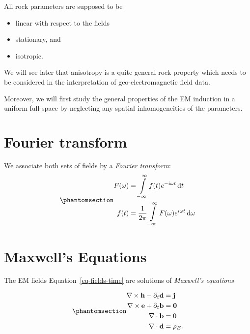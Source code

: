 \documentclass[
  a4paper,
  DIV=11,
  numbers=noendperiod]{scrreprt}
\providecommand{\tightlist}{%
  \setlength{\itemsep}{0pt}\setlength{\parskip}{0pt}}\usepackage{longtable,booktabs,array}
\begin{document}
All rock parameters are supposed to be

\begin{itemize}
\tightlist
\item
  linear with respect to the fields
\item
  stationary, and
\item
  isotropic.
\end{itemize}

We will see later that anisotropy is a quite general rock property which
needs to be considered in the interpretation of geo-electromagnetic
field data.

Moreover, we will first study the general properties of the EM induction
in a uniform full-space by neglecting any spatial inhomogeneities of the
parameters.

\chapter{Fourier transform}\label{fourier-transform}

We associate both sets of fields by a \emph{Fourier transform}:
\begin{equation}\phantomsection\label{eq-fourier}{
\begin{align}
F(\omega) & = \int\limits_{-\infty}^\infty f(t) e^{-i\omega t}\,\mathrm d t \\
f(t) & = \frac{1}{2\pi} \int\limits_{-\infty}^\infty F(\omega) e^{i\omega t}\,\mathrm d\omega
\end{align}
}\end{equation}

\chapter{Maxwell's Equations}\label{maxwells-equations}

The EM fields Equation~\ref{eq-fields-time} are solutions of
\emph{Maxwell's equations}

\begin{equation}\phantomsection\label{eq-maxwell-time}{
\begin{align}\nabla \times \mathbf h - \partial_t \mathbf d  & = \mathbf j \\\nabla \times \mathbf e + \partial_t \mathbf b & = \mathbf 0 \\\nabla \cdot \mathbf b & = 0 \\\nabla \cdot \mathbf d & = \rho_E.\end{align}
}\end{equation}
\end{document}
